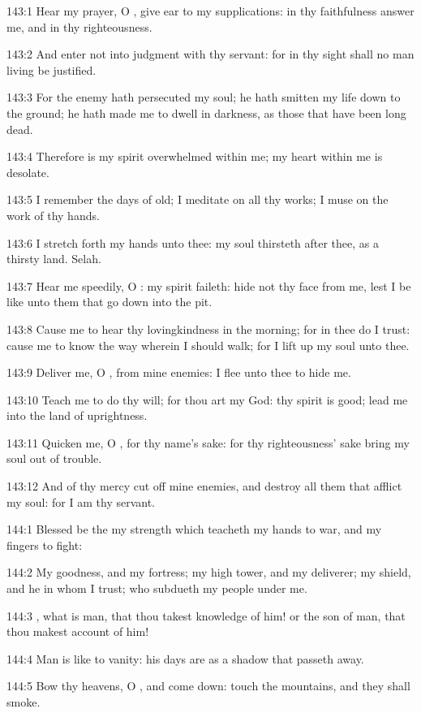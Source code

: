 143:1 Hear my prayer, O \LORD, give ear to my supplications: in thy
faithfulness answer me, and in thy righteousness.

143:2 And enter not into judgment with thy servant: for in thy sight
shall no man living be justified.

143:3 For the enemy hath persecuted my soul; he hath smitten my life
down to the ground; he hath made me to dwell in darkness, as those
that have been long dead.

143:4 Therefore is my spirit overwhelmed within me; my heart within me
is desolate.

143:5 I remember the days of old; I meditate on all thy works; I muse
on the work of thy hands.

143:6 I stretch forth my hands unto thee: my soul thirsteth after
thee, as a thirsty land. Selah.

143:7 Hear me speedily, O \LORD: my spirit faileth: hide not thy face
from me, lest I be like unto them that go down into the pit.

143:8 Cause me to hear thy lovingkindness in the morning; for in thee
do I trust: cause me to know the way wherein I should walk; for I lift
up my soul unto thee.

143:9 Deliver me, O \LORD, from mine enemies: I flee unto thee to hide
me.

143:10 Teach me to do thy will; for thou art my God: thy spirit is
good; lead me into the land of uprightness.

143:11 Quicken me, O \LORD, for thy name's sake: for thy righteousness'
sake bring my soul out of trouble.

143:12 And of thy mercy cut off mine enemies, and destroy all them
that afflict my soul: for I am thy servant.



144:1 Blessed be the \LORD my strength which teacheth my hands to war,
and my fingers to fight:

144:2 My goodness, and my fortress; my high tower, and my deliverer;
my shield, and he in whom I trust; who subdueth my people under me.

144:3 \LORD, what is man, that thou takest knowledge of him! or the son
of man, that thou makest account of him!

144:4 Man is like to vanity: his days are as a shadow that passeth
away.

144:5 Bow thy heavens, O \LORD, and come down: touch the mountains, and
they shall smoke.

